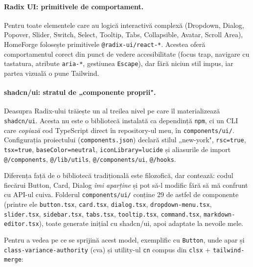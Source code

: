 \paragraph{Radix UI: primitivele de comportament.} Pentru toate elementele care au logică interactivă complexă (Dropdown, Dialog, Popover, Slider, Switch, Select, Tooltip, Tabs, Collapsible, Avatar, Scroll Area), HomeForge folosește primitivele \texttt{@radix-ui/react-*}. Acestea oferă comportamentul corect din punct de vedere accesibilitate (focus trap, navigare cu tastatura, atribute \texttt{aria-*}, gestiunea \texttt{Escape}), dar fără niciun stil impus, iar partea vizuală o pune Tailwind.

\paragraph{shadcn/ui: stratul de „componente proprii".} Deasupra Radix-ului trăiește un al treilea nivel pe care îl materializează \texttt{shadcn/ui}. Acesta nu este o bibliotecă instalată ca dependință \texttt{npm}, ci un CLI care \emph{copiază} cod TypeScript direct în repository-ul meu, în \texttt{components/ui/}. Configurația proiectului (\texttt{components.json}) declară stilul „new-york", \texttt{rsc=true}, \texttt{tsx=true}, \texttt{baseColor=neutral}, \texttt{iconLibrary=lucide} și aliasurile de import \texttt{@/components}, \texttt{@/lib/utils}, \texttt{@/components/ui}, \texttt{@/hooks}.

Diferența față de o bibliotecă tradițională este filozofică, dar contează: codul fiecărui Button, Card, Dialog \emph{îmi aparține} și pot să-l modific fără să mă confrunt cu API-ul cuiva. Folderul \texttt{components/ui/} conține 29 de astfel de componente (printre ele \texttt{button.tsx}, \texttt{card.tsx}, \texttt{dialog.tsx}, \texttt{dropdown-menu.tsx}, \texttt{slider.tsx}, \texttt{sidebar.tsx}, \texttt{tabs.tsx}, \texttt{tooltip.tsx}, \texttt{command.tsx}, \texttt{markdown-editor.tsx}), toate generate inițial cu shadcn/ui, apoi adaptate la nevoile mele.

Pentru a vedea pe ce se sprijină acest model, exemplific cu \texttt{Button}, unde apar și \texttt{class-variance-authority} (cva) și utility-ul \texttt{cn} compus din \texttt{clsx} + \texttt{tailwind-merge}:

